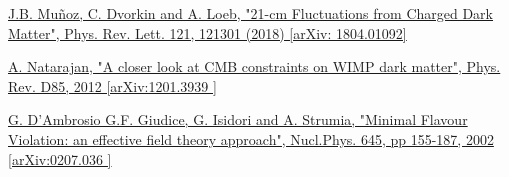 \documentclass[a4paper, 10pt, openright]{report}
\begin{document}
\begin{thebibliography}{1}
\href{https://arxiv.org/abs/1804.01092}{J.B. Mu\~{n}oz, C. Dvorkin and A. Loeb,
"21-cm Fluctuations from Charged Dark Matter",
Phys. Rev. Lett. 121, 121301 (2018) [arXiv: 1804.01092]}

\href{https://arxiv.org/abs/1201.3939}{A. Natarajan,
"A closer look at CMB constraints on WIMP dark matter",
Phys. Rev. D85, 2012 [arXiv:1201.3939 ]}

\href{https://arxiv.org/abs/hep-ph/0207036}{G. D'Ambrosio G.F. Giudice, G. Isidori and A. Strumia,
"Minimal Flavour Violation: an effective field theory approach",
Nucl.Phys. 645, pp 155-187, 2002 [arXiv:0207.036 ]}



%
%




\end{thebibliography}
\end{document}

